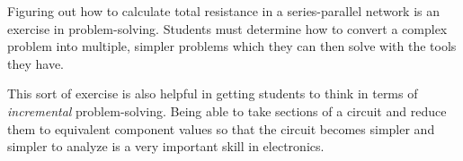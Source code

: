 
Figuring out how to calculate total resistance in a series-parallel network is an exercise in problem-solving.  Students must determine how to convert a complex problem into multiple, simpler problems which they can then solve with the tools they have.

This sort of exercise is also helpful in getting students to think in terms of {\it incremental} problem-solving.  Being able to take sections of a circuit and reduce them to equivalent component values so that the circuit becomes simpler and simpler to analyze is a very important skill in electronics.




